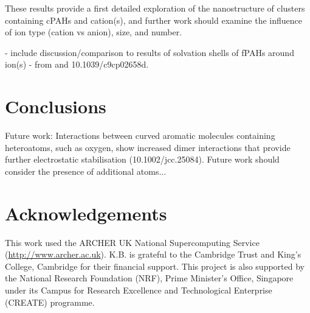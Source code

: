 
These results provide a first detailed exploration of the nanostructure of clusters containing cPAHs and cation(s), and further work should examine the influence of ion type (cation vs anion), size, and number.

- include discussion/comparison to results of solvation shells of fPAHs around ion(s) - from \cite{bowal2019ion} and 10.1039/c9cp02658d.


\section{Conclusions}

Future work:
Interactions between curved aromatic molecules containing heteroatoms, such as oxygen, show increased dimer interactions that provide further electrostatic stabilisation (10.1002/jcc.25084).  Future work should consider the presence of additional atoms...




\section*{Acknowledgements}
This work used the ARCHER UK National Supercomputing Service (\url{http://www.archer.ac.uk}).
K.B. is grateful to the Cambridge Trust and King's College, Cambridge for their financial support.
This project is also supported by the National Research Foundation (NRF), Prime Minister's Office, Singapore under its Campus for Research Excellence and Technological Enterprise (CREATE) programme.
